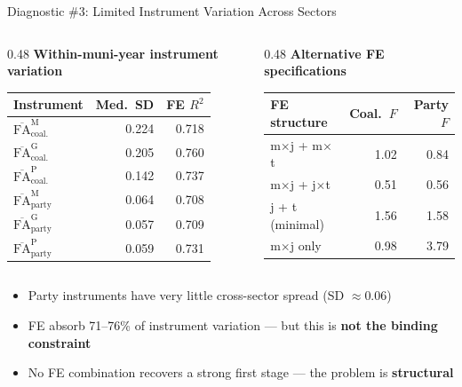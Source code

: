 \documentclass[aspectratio=169,11pt]{beamer}
\newcommand{\FA}{\mathrm{FA}}
\begin{document}
\begin{frame}[shrink=8]{Diagnostic \#3: Limited Instrument Variation Across Sectors}

\begin{columns}[T]
\begin{column}{0.48\textwidth}
\centering
\scriptsize
\textbf{Within-muni-year instrument variation}

\smallskip
\begin{tabular}{l r r}
\toprule
\textbf{Instrument} & \textbf{Med.\ SD} & \textbf{FE $R^2$} \\
\midrule
$\overline{\FA}^{\text{M}}_{\text{coal.}}$ & 0.224 & 0.718 \\
$\overline{\FA}^{\text{G}}_{\text{coal.}}$ & 0.205 & 0.760 \\
$\overline{\FA}^{\text{P}}_{\text{coal.}}$ & 0.142 & 0.737 \\
\midrule
$\overline{\FA}^{\text{M}}_{\text{party}}$ & 0.064 & 0.708 \\
$\overline{\FA}^{\text{G}}_{\text{party}}$ & 0.057 & 0.709 \\
$\overline{\FA}^{\text{P}}_{\text{party}}$ & 0.059 & 0.731 \\
\bottomrule
\end{tabular}
\end{column}
\begin{column}{0.48\textwidth}
\centering
\scriptsize
\textbf{Alternative FE specifications}

\smallskip
\begin{tabular}{l r r}
\toprule
\textbf{FE structure} & \textbf{Coal.\ $F$} & \textbf{Party $F$} \\
\midrule
m$\times$j + m$\times$t & 1.02 & 0.84 \\
m$\times$j + j$\times$t & 0.51 & 0.56 \\
j + t (minimal) & 1.56 & 1.58 \\
m$\times$j only & 0.98 & 3.79 \\
\bottomrule
\end{tabular}
\end{column}
\end{columns}

\bigskip

\begin{itemize}\setlength{\itemsep}{2pt}
    \item Party instruments have very little cross-sector spread (SD $\approx 0.06$)
    \item FE absorb 71--76\% of instrument variation --- but this is \textbf{not the binding constraint}
    \item No FE combination recovers a strong first stage --- the problem is \textbf{structural}
\end{itemize}

\end{frame}
\end{document}
